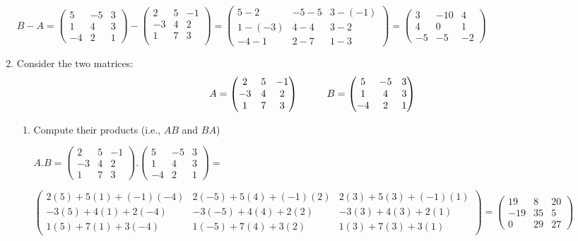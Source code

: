 \documentclass[fleqn]{article}
\begin{document}
\begin{enumerate}
\noindent
$B-A=
\begin{pmatrix}
  5 & -5 & 3 \\
  1 & 4 & 3 \\
  -4 & 2 & 1
\end{pmatrix}
-
\begin{pmatrix}
  2 & 5 & -1 \\
  -3 & 4 & 2 \\ 
  1 & 7 & 3 \\ 
\end{pmatrix}
=
\begin{pmatrix}
  5-2 & -5-5 & 3-(-1) \\
  1-(-3) & 4-4 & 3-2 \\
  -4-1 & 2-7 & 1-3
\end{pmatrix}
=
\begin{pmatrix}
  3 & -10 & 4 \\
  4 & 0 & 1 \\
  -5 & -5 & -2
\end{pmatrix}
$

\item  Consider the two matrices:
$$A=\begin{pmatrix}
2 & 5 & -1 \\
-3 & 4 & 2 \\
1 & 7 & 3
\end{pmatrix} \hskip 1truecm B=\begin{pmatrix}
5 & -5 & 3 \\
1 & 4 & 3 \\
-4 & 2 & 1
\end{pmatrix}$$ 
\begin{enumerate}
\item Compute their products  (i.e., $AB$ and $BA$)

\noindent
$A.B=
\begin{pmatrix}
  2 & 5 & -1 \\
  -3 & 4 & 2 \\
  1 & 7 & 3
\end{pmatrix}
.
\begin{pmatrix}
  5 & -5 & 3 \\
  1 & 4 & 3 \\
  -4 & 2 & 1
\end{pmatrix}
=
$

$
\begin{pmatrix}
  2(5)+5(1)+(-1)(-4) & 2(-5)+5(4)+(-1)(2) & 2(3)+5(3)+(-1)(1) \\
  -3(5)+4(1)+2(-4) & -3(-5)+4(4)+2(2) & -3(3)+4(3)+2(1) \\
  1(5)+7(1)+3(-4) & 1(-5)+7(4)+3(2) & 1(3)+7(3)+3(1)
\end{pmatrix}
=
\begin{pmatrix}
  19 & 8 & 20 \\
  -19 & 35 & 5 \\
  0 & 29 & 27
\end{pmatrix}
$



\end{enumerate}
\end{enumerate}
\end{document}
